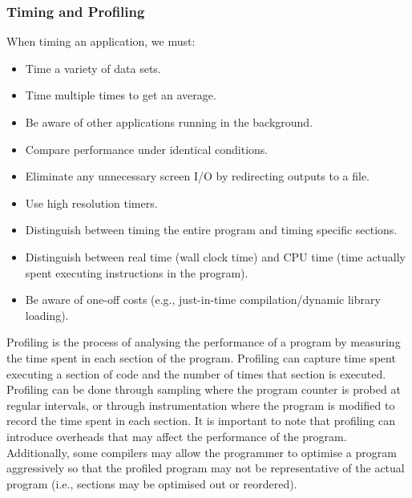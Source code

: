 \documentclass{article}
\begin{document}
\subsubsection{Timing and Profiling}
When timing an application, we must:
\begin{itemize}
    \item Time a variety of data sets.
    \item Time multiple times to get an average.
    \item Be aware of other applications running in the background.
    \item Compare performance under identical conditions.
    \item Eliminate any unnecessary screen I/O by redirecting outputs
          to a file.
    \item Use high resolution timers.
    \item Distinguish between timing the entire program and timing
          specific sections.
    \item Distinguish between real time (wall clock time) and CPU time
          (time actually spent executing instructions in the program).
    \item Be aware of one-off costs (e.g., just-in-time
          compilation/dynamic library loading).
\end{itemize}
Profiling is the process of analysing the performance of a program by
measuring the time spent in each section of the program. Profiling can
capture time spent executing a section of code and the number of times
that section is executed. Profiling can be done through sampling where
the program counter is probed at regular intervals, or through
instrumentation where the program is modified to record the time spent
in each section. It is important to note that profiling can introduce
overheads that may affect the performance of the program. Additionally,
some compilers may allow the programmer to optimise a program aggressively
so that the profiled program may not be representative of the actual
program (i.e., sections may be optimised out or reordered).
\end{document}
